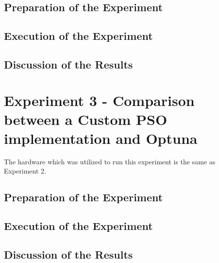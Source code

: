 % 
% 
% 

\subsection{Preparation of the Experiment}

\subsection{Execution of the Experiment}

\subsection{Discussion of the Results}

\section{Experiment 3 - Comparison between a Custom PSO implementation and Optuna}

The hardware which was utilized to run this experiment is the same as Experiment 2.

\subsection{Preparation of the Experiment}

\subsection{Execution of the Experiment}

\subsection{Discussion of the Results}

